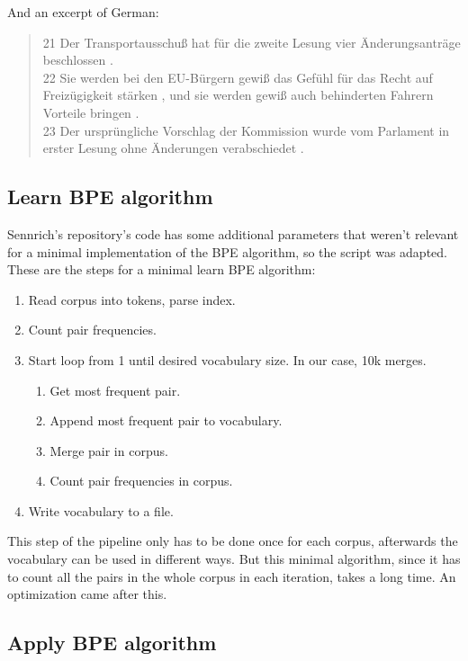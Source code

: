 And an excerpt of German:

\begin{quote}
	21	Der Transportausschuß hat für die zweite Lesung vier Änderungsanträge beschlossen .\\
	22	Sie werden bei den EU-Bürgern gewiß das Gefühl für das Recht auf Freizügigkeit stärken , und sie werden gewiß auch behinderten Fahrern Vorteile bringen .\\
	23	Der ursprüngliche Vorschlag der Kommission wurde vom Parlament in erster Lesung ohne Änderungen verabschiedet .
\end{quote}

\subsection{Learn BPE algorithm}

Sennrich's repository's code has some additional parameters that weren't relevant for a minimal implementation of the BPE algorithm, so the script was adapted. These are the steps for a minimal learn BPE algorithm:

\begin{enumerate}
	\item Read corpus into tokens, parse index.
	\item Count pair frequencies.
	\item Start loop from 1 until desired vocabulary size. In our case, 10k merges.
	\begin{enumerate}
		\item Get most frequent pair.
		\item Append most frequent pair to vocabulary.
		\item Merge pair in corpus.
		\item Count pair frequencies in corpus.
	\end{enumerate}
	\item Write vocabulary to a file.
\end{enumerate}

This step of the pipeline only has to be done once for each corpus, afterwards the vocabulary can be used in different ways. But this minimal algorithm, since it has to count all the pairs in the whole corpus in each iteration, takes a long time. An optimization came after this.

\subsection{Apply BPE algorithm}


